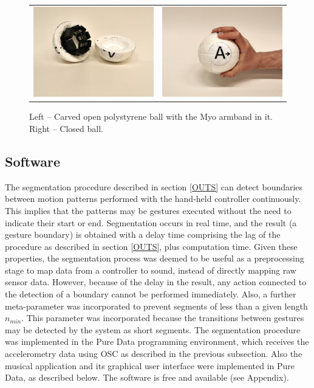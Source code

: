 \documentclass{nime-alternate_MANUSCRIPT} %
\begin{document}
\begin{figure}[t!]
   \setlength\tabcolsep{2pt} 
    \begin{tabular}{cc}
        \includegraphics[trim={10cm 24cm 10cm 6cm}, clip=true, width=0.48\columnwidth]{ball_open}
        &
        \includegraphics[trim={20cm 15cm 0cm 15cm}, clip=true, width=0.48\columnwidth]{ball_handheld}
    \end{tabular}
	\caption{Left -- Carved open polystyrene ball with the Myo armband in it. Right -- Closed ball.}
	\label{fig_2}
\end{figure}

\subsection{Software}

The segmentation procedure described in section \ref{OUTS} can detect boundaries between motion patterns performed with the hand-held controller continuously. This implies that the patterns may be gestures executed without the need to indicate their start or end. Segmentation occurs in real time, and the result (a gesture boundary) is obtained with a delay time comprising the lag of the procedure as described in section \ref{OUTS}, plus computation time. Given these properties, the segmentation process was deemed to be useful as a preprocessing stage to map data from a controller to sound, instead of directly mapping raw sensor data. However, because of the delay in the result, any action connected to the detection of a boundary cannot be performed immediately. Also, a further meta-parameter was incorporated to prevent segments of less than a given length $n_{min}$. This parameter was incorporated because the transitions between gestures may be detected by the system as short segments. The segmentation procedure was implemented in the Pure Data programming environment, which receives the accelerometry data using OSC as described in the previous subsection. Also the musical application and its graphical user interface were implemented in Pure Data, as described below. The software is free and available (see Appendix).  
\end{document}
